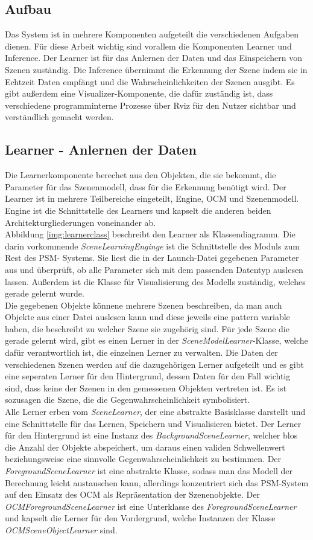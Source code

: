\subsection{Aufbau}
Das System ist in mehrere Komponenten aufgeteilt die verschiedenen Aufgaben dienen. Für diese Arbeit wichtig sind vorallem die Komponenten Learner und Inference. Der Learner ist für das Anlernen der Daten und das Einspeichern von Szenen zuständig. Die Inference übernimmt die Erkennung der Szene indem sie in Echtzeit Daten empfängt und die Wahrscheinlichkeiten der Szenen ausgibt. Es gibt außerdem eine Visualizer-Komponente, die dafür zuständig ist, dass verschiedene programminterne Prozesse über Rviz für den Nutzer sichtbar und verständlich gemacht werden.
\subsection{Learner - Anlernen der Daten}
Die Learnerkomponente berechet aus den Objekten, die sie bekommt, die Parameter für das Szenenmodell, dass für die Erkennung benötigt wird. Der Learner ist in mehrere Teilbereiche eingeteilt, Engine, OCM und Szenenmodell. Engine ist die Schnittstelle des Learners und kapselt die anderen beiden Architekturgliederungen voneinander ab.\smallskip\\
Abbildung \ref{img:learnerclass} beschreibt den Learner als Klassendiagramm. Die darin vorkommende \textit{SceneLearningEnginge} ist die Schnittstelle des Moduls zum Rest des PSM- Systems. Sie liest die in der Launch-Datei gegebenen Parameter aus und überprüft, ob alle Parameter sich mit dem passenden Datentyp auslesen lassen. Außerdem ist die Klasse für Visualisierung des Modells zuständig, welches gerade gelernt wurde. \smallskip\\
Die gegebenen Objekte könnene mehrere Szenen beschreiben, da man auch Objekte aus einer Datei auslesen kann und diese jeweils eine pattern variable haben, die beschreibt zu welcher Szene sie zugehörig sind. Für jede Szene die gerade gelernt wird, gibt es einen Lerner in der \textit{SceneModelLearner}-Klasse, welche dafür verantwortlich ist, die einzelnen Lerner zu verwalten. Die Daten der verschiedenen Szenen werden auf die dazugehörigen Lerner aufgeteilt und es gibt eine seperaten Lerner für den Hintergrund, dessen Daten für den Fall wichtig sind, dass keine der Szenen in den gemessenen Objekten vertreten ist. Es ist sozusagen die Szene, die die Gegenwahrscheinlichkeit symbolisiert.\smallskip\\
Alle Lerner erben vom \textit{SceneLearner}, der eine abstrakte Basisklasse darstellt und eine Schnittstelle für das Lernen, Speichern und Visualisieren bietet. Der Lerner für den Hintergrund ist eine Instanz des \textit{BackgroundSceneLearner}, welcher blos die Anzahl der Objekte abspeichert, um daraus einen validen Schwellenwert beziehungsweise eine sinnvolle Gegenwahrscheinlichkeit zu bestimmen. Der \textit{ForegroundSceneLearner} ist eine abstrakte Klasse, sodass man das Modell der Berechnung leicht austauschen kann, allerdings konzentriert sich das PSM-System auf den Einsatz des OCM als Repräsentation der Szenenobjekte. Der \textit{OCMForegroundSceneLearner} ist eine Unterklasse des \textit{ForegroundSceneLearner} und kapselt die Lerner für den Vordergrund, welche Instanzen der Klasse \textit{OCMSceneObjectLearner} sind.
